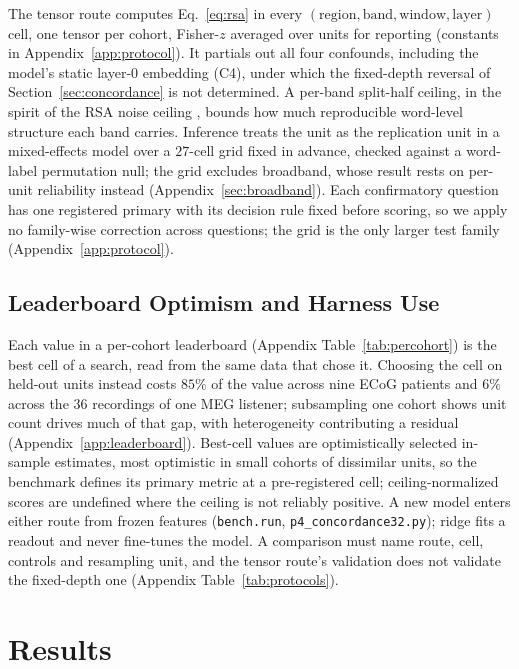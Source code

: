 \documentclass{article}
\begin{document}
The tensor route computes Eq.~\eqref{eq:rsa} in every
$(\text{region},\text{band},\text{window},\text{layer})$ cell, one tensor per cohort, Fisher-$z$
averaged over units for reporting (constants in Appendix~\ref{app:protocol}). It partials out all
four confounds, including the model's static layer-0 embedding (C4), under which the fixed-depth
reversal of Section~\ref{sec:concordance} is not determined. A per-band split-half ceiling, in the spirit of the RSA noise ceiling
\citep{nili2014toolbox}, bounds how much reproducible word-level structure each band carries.
Inference treats the unit as the replication unit in a mixed-effects model over a $27$-cell grid
fixed in advance, checked against a word-label permutation null; the grid excludes broadband, whose result rests on
per-unit reliability instead (Appendix~\ref{sec:broadband}). Each confirmatory question has one
registered primary with its decision rule fixed before scoring, so we apply no family-wise
correction across questions; the grid is the only larger test family (Appendix~\ref{app:protocol}).

\subsection{Leaderboard Optimism and Harness Use}\label{sec:leaderboard}\label{sec:harness}

Each value in a per-cohort leaderboard (Appendix Table~\ref{tab:percohort}) is the best cell of a
search, read from the same data that chose it. Choosing the cell on held-out units instead costs
$85\%$ of the value across nine ECoG patients and $6\%$ across the $36$ recordings of one MEG
listener; subsampling one cohort shows unit count drives much of that gap, with heterogeneity
contributing a residual (Appendix~\ref{app:leaderboard}). Best-cell values are optimistically selected in-sample estimates, most optimistic
in small cohorts of dissimilar units, so the benchmark defines its primary metric at a
pre-registered cell; ceiling-normalized scores are undefined where the ceiling is not reliably
positive. A new model enters either route from frozen features (\texttt{bench.run},
\texttt{p4\_concordance32.py}); ridge fits a readout and never fine-tunes the model. A comparison must name route, cell,
controls and resampling unit, and the tensor route's validation does not validate the fixed-depth
one (Appendix Table~\ref{tab:protocols}).

\section{Results}\label{reveals}
\end{document}
